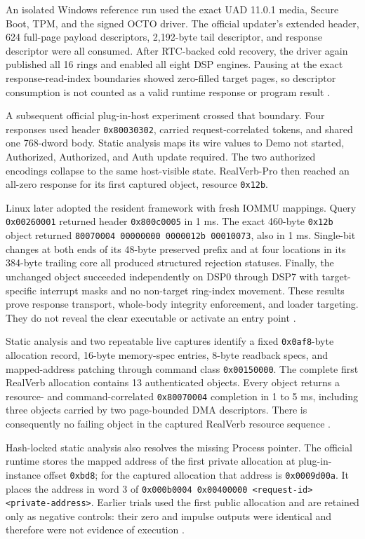 \documentclass[10pt,twocolumn,twoside]{article}
\begin{document}
An isolated Windows reference run used the exact UAD 11.0.1 media, Secure
Boot, TPM, and the signed OCTO driver. The official updater's extended header,
624 full-page payload descriptors, 2,192-byte tail descriptor, and response
descriptor were all consumed. After RTC-backed cold recovery, the driver again
published all 16 rings and enabled all eight DSP engines. Pausing at the exact
response-read-index boundaries showed zero-filled target pages, so descriptor
consumption is not counted as a valid runtime response or program result
\cite{uad-project}.

A subsequent official plug-in-host experiment crossed that boundary. Four
responses used header \texttt{0x80030302}, carried request-correlated tokens,
and shared one 768-dword body. Static analysis maps its wire values to Demo not
started, Authorized, Authorized, and Auth update required. The two authorized
encodings collapse to the same host-visible state. RealVerb-Pro then reached an
all-zero response for its first captured object, resource \texttt{0x12b}.

Linux later adopted the resident framework with fresh IOMMU mappings. Query
\texttt{0x00260001} returned header \texttt{0x800c0005} in 1 ms. The exact
460-byte \texttt{0x12b} object returned
\texttt{80070004 00000000 0000012b 00010073}, also in 1 ms. Single-bit changes
at both ends of its 48-byte preserved prefix and at four locations in its
384-byte trailing core all produced structured rejection statuses. Finally,
the unchanged object succeeded independently on DSP0 through DSP7 with
target-specific interrupt masks and no non-target ring-index movement. These
results prove response transport, whole-body integrity enforcement, and loader
targeting. They do not reveal the clear executable or activate an entry point
\cite{uad-project}.

Static analysis and two repeatable live captures identify a fixed
\texttt{0x0af8}-byte allocation record, 16-byte memory-spec entries, 8-byte
readback specs, and mapped-address patching through command class
\texttt{0x00150000}. The complete first RealVerb allocation contains 13
authenticated objects. Every object returns a resource- and command-correlated
\texttt{0x80070004} completion in 1 to 5 ms, including three objects carried by
two page-bounded DMA descriptors. There is consequently no failing object in
the captured RealVerb resource sequence \cite{uad-project}.

Hash-locked static analysis also resolves the missing Process pointer. The
official runtime stores the mapped address of the first private allocation at
plug-in-instance offset \texttt{0xbd8}; for the captured allocation that address
is \texttt{0x0009d00a}. It places the address in word 3 of
\texttt{0x000b0004 0x00400000 <request-id> <private-address>}. Earlier trials
used the first public allocation and are retained only as negative controls:
their zero and impulse outputs were identical and therefore were not evidence
of execution \cite{uad-project}.
\end{document}
